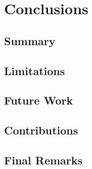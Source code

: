 \chapter {Conclusions}

\section{Summary}
\section{Limitations}
\section{Future Work}
\section{Contributions}
\section{Final Remarks}

